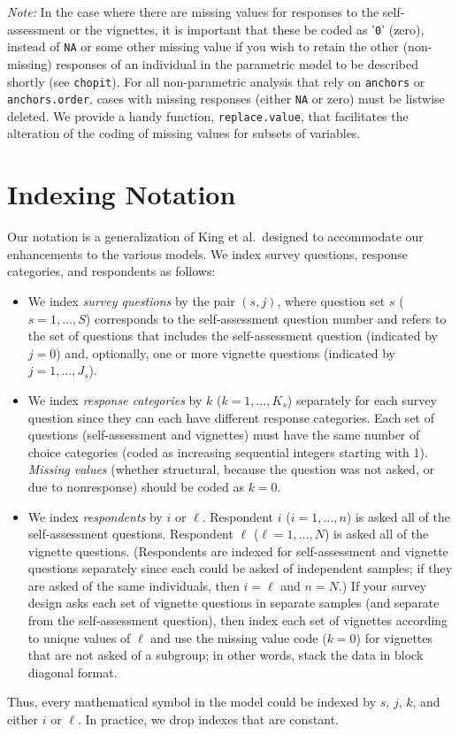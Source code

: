 \documentclass{amsart}
\newcommand{\code}[1]{{\texttt{#1}}}
\begin{document}
{\em Note:} In the case where there are missing values for responses
to the self-assessment or the vignettes, it is important that these be
coded as '\code{0}' (zero), instead of \code{NA} or some other missing
value if you wish to retain the other (non-missing) responses of an
individual in the parametric model to be described shortly (see
\code{chopit}). For all non-parametric analysis that rely
on \code{anchors} or \code{anchors.order}, cases with missing
responses (either \code{NA} or zero) must be listwise deleted.  We
provide a handy function, \code{replace.value}, that facilitates the
alteration of the coding of missing values for subsets of variables.


\section{Indexing Notation}

Our notation is a generalization of King et al.\ designed to
accommodate our enhancements to the various models.  We index survey
questions, response categories, and respondents as follows:
\begin{itemize}
\item We index \emph{survey questions} by the pair $(s,j)$, where
  question set $s$ ($s=1,\dots,S$) corresponds to the self-assessment
  question number and refers to the set of questions that includes the
  self-assessment question (indicated by $j=0$) and, optionally, one
  or more vignette questions (indicated by $j=1,\dots,J_s$).
  
\item We index \emph{response categories} by $k$ ($k=1,\dots,K_s$)
  separately for each survey question since they can each have
  different response categories.  Each set of questions
  (self-assessment and vignettes) must have the same number of choice
  categories (coded as increasing sequential integers starting with
  1).  \emph{Missing values} (whether structural, because the question
  was not asked, or due to nonresponse) should be coded as $k=0$.
  
\item We index \emph{respondents} by $i$ or $\ell$.  Respondent $i$
  ($i=1,\dots,n$) is asked all of the self-assessment questions.
  Respondent $\ell$ ($\ell=1,\dots,N$) is asked all of the vignette
  questions.  (Respondents are indexed for self-assessment and
  vignette questions separately since each could be asked of
  independent samples; if they are asked of the same individuals, then
  $i=\ell$ and $n=N$.)  If your survey design asks each set of
  vignette questions in separate samples (and separate from the
  self-assessment question), then index each set of vignettes
  according to unique values of $\ell$ and use the missing value code
  ($k=0$) for vignettes that are not asked of a subgroup; in other
  words, stack the data in block diagonal format.
\end{itemize}
Thus, every mathematical symbol in the model could be indexed by $s$,
$j$, $k$, and either $i$ or $\ell$.  In practice, we drop indexes that
are constant.
\end{document}
